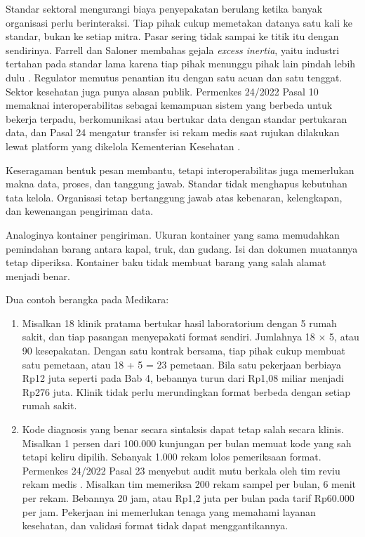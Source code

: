 Standar sektoral mengurangi biaya penyepakatan berulang ketika banyak organisasi perlu berinteraksi. Tiap pihak cukup
memetakan datanya satu kali ke standar, bukan ke setiap mitra. Pasar sering tidak sampai ke titik itu dengan
sendirinya. Farrell dan Saloner membahas gejala \textit{excess inertia}, yaitu industri tertahan pada standar lama
karena tiap pihak menunggu pihak lain pindah lebih dulu \cite{c07-farrell1985}. Regulator memutus penantian itu dengan
satu acuan dan satu tenggat. Sektor kesehatan juga punya alasan publik. Permenkes 24/2022 Pasal 10 memaknai
interoperabilitas sebagai kemampuan sistem yang berbeda untuk bekerja terpadu, berkomunikasi atau bertukar data dengan
standar pertukaran data, dan Pasal 24 mengatur transfer isi rekam medis saat rujukan dilakukan lewat platform yang
dikelola Kementerian Kesehatan \cite{permenkes24-2022}.

Keseragaman bentuk pesan membantu, tetapi interoperabilitas juga memerlukan makna data, proses, dan tanggung jawab.
Standar tidak menghapus kebutuhan tata kelola. Organisasi tetap bertanggung jawab atas kebenaran, kelengkapan, dan
kewenangan pengiriman data.

Analoginya kontainer pengiriman. Ukuran kontainer yang sama memudahkan pemindahan barang antara kapal, truk, dan
gudang. Isi dan dokumen muatannya tetap diperiksa. Kontainer baku tidak membuat barang yang salah alamat menjadi
benar.

Dua contoh berangka pada Medikara:
\begin{enumerate}
  \item Misalkan 18 klinik pratama bertukar hasil laboratorium dengan 5 rumah sakit, dan tiap pasangan menyepakati
        format sendiri. Jumlahnya 18 $\times$ 5, atau 90 kesepakatan. Dengan satu kontrak bersama, tiap pihak cukup
        membuat satu pemetaan, atau 18 + 5 = 23 pemetaan. Bila satu pekerjaan berbiaya Rp12 juta seperti pada Bab 4,
        bebannya turun dari Rp1,08 miliar menjadi Rp276 juta. Klinik tidak perlu merundingkan format berbeda dengan
        setiap rumah sakit.
  \item Kode diagnosis yang benar secara sintaksis dapat tetap salah secara klinis. Misalkan 1 persen dari 100.000
        kunjungan per bulan memuat kode yang sah tetapi keliru dipilih. Sebanyak 1.000 rekam lolos pemeriksaan format.
        Permenkes 24/2022 Pasal 23 menyebut audit mutu berkala oleh tim reviu rekam medis \cite{permenkes24-2022}.
        Misalkan tim memeriksa 200 rekam sampel per bulan, 6 menit per rekam. Bebannya 20 jam, atau Rp1,2 juta per
        bulan pada tarif Rp60.000 per jam. Pekerjaan ini memerlukan tenaga yang memahami layanan kesehatan, dan
        validasi format tidak dapat menggantikannya.
\end{enumerate}

